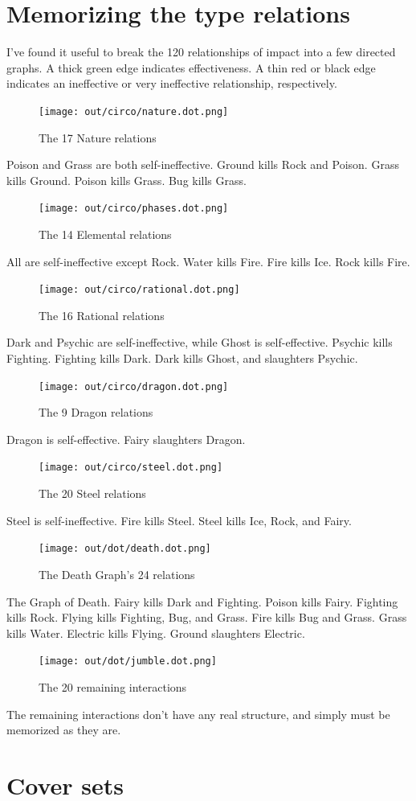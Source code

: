 \section{Memorizing the type relations}
I've found it useful to break the 120 relationships of impact into a few directed graphs.
A thick green edge indicates effectiveness.
A thin red or black edge indicates an ineffective or very ineffective relationship, respectively.

\begin{figure}[h]
\centering
\texttt{[image: out/circo/nature.dot.png]}
\caption{The 17 Nature relations}
\end{figure}
Poison and Grass are both self-ineffective.
Ground kills Rock and Poison.
Grass kills Ground.
Poison kills Grass.
Bug kills Grass.

\begin{figure}[h]
\centering
\texttt{[image: out/circo/phases.dot.png]}
\caption{The 14 Elemental relations}
\end{figure}
All are self-ineffective except Rock.
Water kills Fire.
Fire kills Ice.
Rock kills Fire.

\begin{figure}[h]
\centering
\texttt{[image: out/circo/rational.dot.png]}
\caption{The 16 Rational relations}
\end{figure}
Dark and Psychic are self-ineffective, while Ghost is self-effective.
Psychic kills Fighting.
Fighting kills Dark.
Dark kills Ghost, and slaughters Psychic.

\begin{figure}
\centering
\texttt{[image: out/circo/dragon.dot.png]}
\caption{The 9 Dragon relations}
\end{figure}
Dragon is self-effective.
Fairy slaughters Dragon.

\begin{figure}
\centering
\texttt{[image: out/circo/steel.dot.png]}
\caption{The 20 Steel relations}
\end{figure}
Steel is self-ineffective.
Fire kills Steel.
Steel kills Ice, Rock, and Fairy.

\begin{figure}[h]
\centering
\texttt{[image: out/dot/death.dot.png]}
\caption{The Death Graph's 24 relations}
\end{figure}
The Graph of Death.
Fairy kills Dark and Fighting.
Poison kills Fairy.
Fighting kills Rock.
Flying kills Fighting, Bug, and Grass.
Fire kills Bug and Grass.
Grass kills Water.
Electric kills Flying.
Ground slaughters Electric.

\begin{figure}[h]
\centering
\texttt{[image: out/dot/jumble.dot.png]}
\caption{The 20 remaining interactions}
\end{figure}
The remaining interactions don't have any real structure, and simply must be
memorized as they are.

\section{Cover sets}

